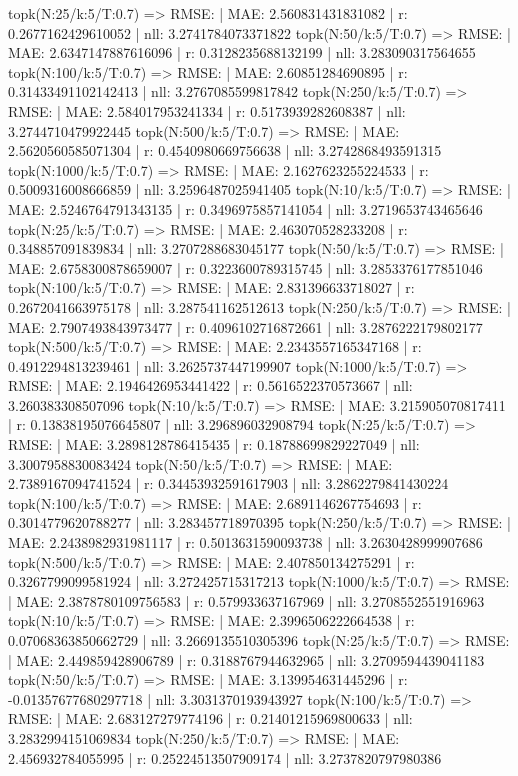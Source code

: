 topk(N:25/k:5/T:0.7) => RMSE: | MAE: 2.560831431831082 | r: 0.2677162429610052 | nll: 3.2741784073371822
topk(N:50/k:5/T:0.7) => RMSE: | MAE: 2.6347147887616096 | r: 0.3128235688132199 | nll: 3.283090317564655
topk(N:100/k:5/T:0.7) => RMSE: | MAE: 2.60851284690895 | r: 0.31433491102142413 | nll: 3.2767085599817842
topk(N:250/k:5/T:0.7) => RMSE: | MAE: 2.584017953241334 | r: 0.5173939282608387 | nll: 3.2744710479922445
topk(N:500/k:5/T:0.7) => RMSE: | MAE: 2.5620560585071304 | r: 0.4540980669756638 | nll: 3.2742868493591315
topk(N:1000/k:5/T:0.7) => RMSE: | MAE: 2.1627623255224533 | r: 0.5009316008666859 | nll: 3.2596487025941405
topk(N:10/k:5/T:0.7) => RMSE: | MAE: 2.5246764791343135 | r: 0.3496975857141054 | nll: 3.2719653743465646
topk(N:25/k:5/T:0.7) => RMSE: | MAE: 2.463070528233208 | r: 0.348857091839834 | nll: 3.2707288683045177
topk(N:50/k:5/T:0.7) => RMSE: | MAE: 2.6758300878659007 | r: 0.3223600789315745 | nll: 3.2853376177851046
topk(N:100/k:5/T:0.7) => RMSE: | MAE: 2.831396633718027 | r: 0.2672041663975178 | nll: 3.287541162512613
topk(N:250/k:5/T:0.7) => RMSE: | MAE: 2.7907493843973477 | r: 0.4096102716872661 | nll: 3.2876222179802177
topk(N:500/k:5/T:0.7) => RMSE: | MAE: 2.2343557165347168 | r: 0.4912294813239461 | nll: 3.2625737447199907
topk(N:1000/k:5/T:0.7) => RMSE: | MAE: 2.1946426953441422 | r: 0.5616522370573667 | nll: 3.260383308507096
topk(N:10/k:5/T:0.7) => RMSE: | MAE: 3.215905070817411 | r: 0.13838195076645807 | nll: 3.296896032908794
topk(N:25/k:5/T:0.7) => RMSE: | MAE: 3.2898128786415435 | r: 0.18788699829227049 | nll: 3.3007958830083424
topk(N:50/k:5/T:0.7) => RMSE: | MAE: 2.7389167094741524 | r: 0.34453932591617903 | nll: 3.2862279841430224
topk(N:100/k:5/T:0.7) => RMSE: | MAE: 2.6891146267754693 | r: 0.3014779620788277 | nll: 3.283457718970395
topk(N:250/k:5/T:0.7) => RMSE: | MAE: 2.2438982931981117 | r: 0.5013631590093738 | nll: 3.2630428999907686
topk(N:500/k:5/T:0.7) => RMSE: | MAE: 2.407850134275291 | r: 0.3267799099581924 | nll: 3.272425715317213
topk(N:1000/k:5/T:0.7) => RMSE: | MAE: 2.3878780109756583 | r: 0.579933637167969 | nll: 3.2708552551916963
topk(N:10/k:5/T:0.7) => RMSE: | MAE: 2.3996506222664538 | r: 0.07068363850662729 | nll: 3.2669135510305396
topk(N:25/k:5/T:0.7) => RMSE: | MAE: 2.449859428906789 | r: 0.3188767944632965 | nll: 3.2709594439041183
topk(N:50/k:5/T:0.7) => RMSE: | MAE: 3.139954631445296 | r: -0.01357677680297718 | nll: 3.3031370193943927
topk(N:100/k:5/T:0.7) => RMSE: | MAE: 2.683127279774196 | r: 0.21401215969800633 | nll: 3.2832994151069834
topk(N:250/k:5/T:0.7) => RMSE: | MAE: 2.456932784055995 | r: 0.25224513507909174 | nll: 3.2737820797980386
